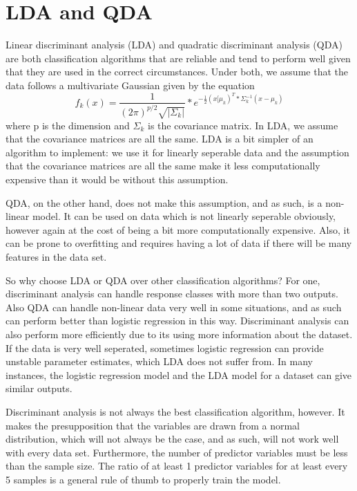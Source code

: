 \section{LDA and QDA}
Linear discriminant analysis (LDA) and quadratic discriminant analysis (QDA) are both classification algorithms that are reliable and tend to perform well given that they are used in the correct circumstances.  Under both, we assume that the data follows a multivariate Gaussian given by the equation
\begin{equation}
f_k(x) = \frac{1}{(2\pi)^{p/2}\sqrt{|\Sigma_k|}}*e^{-\frac{1}{2}(x[\mu_k)^T*\Sigma_k^{-1}(x-\mu_k)}
\end{equation}
where p is the dimension and $\Sigma_k$ is the covariance matrix. In LDA, we assume that the covariance matrices are all the same. LDA is a bit simpler of an algorithm to implement: we use it for linearly seperable data and the assumption that the covariance matrices are all the same make it less computationally expensive than it would be without this assumption.

QDA, on the other hand, does not make this assumption, and as such, is a non-linear model. It can be used on data which is not linearly seperable obviously, however again at the cost of being a bit more computationally expensive. Also, it can be prone to overfitting and requires having a lot of data if there will be many features in the data set. 

So why choose LDA or QDA over other classification algorithms? For one, discriminant analysis can handle response classes with more than two outputs. Also QDA can handle non-linear data very well in some situations, and as such can perform better than logistic regression in this way. Discriminant analysis can also perform more efficiently due to its using more information about the dataset. If the data is very well seperated, sometimes logistic regression can provide unstable parameter estimates, which LDA does not suffer from. In many instances, the logistic regression model and the LDA model for a dataset can give similar outputs.

Discriminant analysis is not always the best classification algorithm, however. It makes the presupposition that the variables are drawn from a normal distribution, which will not always be the case, and as such, will not work well with every data set. Furthermore, the number of predictor variables must be less than the sample size. The ratio of at least 1 predictor variables for at least every 5 samples is a general rule of thumb to properly train the model.
